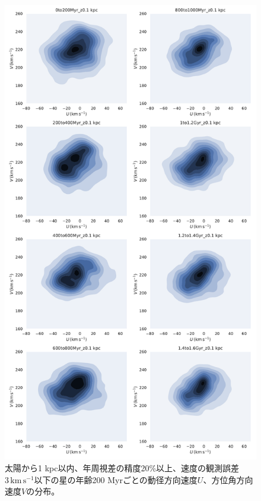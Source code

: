 \begin{figure}[htbp]
\begin{center}
	\includegraphics[width=12cm]{fig/UV/hist_seaborn_1_z0.1kpc.pdf}
	\caption{太陽から1 kpc以内、年周視差の精度20\%以上、速度の観測誤差$3\,\mathrm{km\,s^{-1}}$以下の星の年齢200 Myrごとの動径方向速度$U$、方位角方向速度$V$の分布。}
	\label{hist_seaborn_200Myr}
\end{center}
\end{figure}

